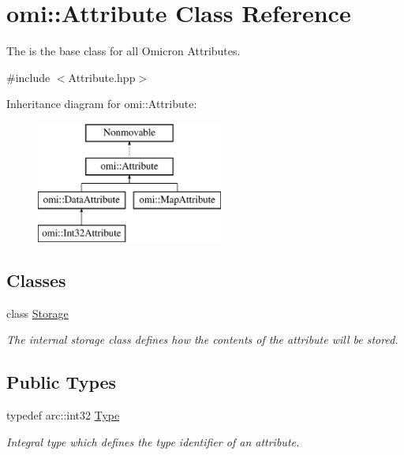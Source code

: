 \hypertarget{classomi_1_1_attribute}{}\section{omi\+:\+:Attribute Class Reference}
\label{classomi_1_1_attribute}


The is the base class for all Omicron Attributes.  




{\ttfamily \#include $<$Attribute.\+hpp$>$}

Inheritance diagram for omi\+:\+:Attribute\+:\begin{figure}[H]
\begin{center}
\leavevmode
\includegraphics[height=4.000000cm]{classomi_1_1_attribute}
\end{center}
\end{figure}
\subsection*{Classes}
\begin{DoxyCompactItemize}
\item 
class \hyperlink{classomi_1_1_attribute_1_1_storage}{Storage}
\begin{DoxyCompactList}\small\item\em The internal storage class defines how the contents of the attribute will be stored. \end{DoxyCompactList}\end{DoxyCompactItemize}
\subsection*{Public Types}
\begin{DoxyCompactItemize}
\item 
typedef arc\+::int32 \hyperlink{classomi_1_1_attribute_aae4992bc8d2b12679548909bc813eecf}{Type}\hypertarget{classomi_1_1_attribute_aae4992bc8d2b12679548909bc813eecf}{}\label{classomi_1_1_attribute_aae4992bc8d2b12679548909bc813eecf}

\begin{DoxyCompactList}\small\item\em Integral type which defines the type identifier of an attribute. \end{DoxyCompactList}\end{DoxyCompactItemize}
